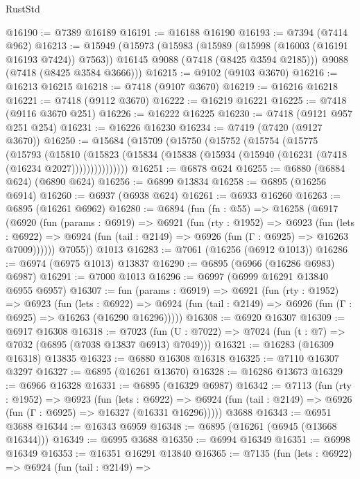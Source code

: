 \begin{lexlean}{RustStd}
\begin{coremodule}
@16190 := @7389 @16189
@16191 := @16188 @16190
@16193 := @7394 (@7414 @962)
@16213 := @15949
    (@15973
      (@15983
        (@15989 (@15998 (@16003 (@16191 @16193 @7424)) @7563))
        @16145
        @9088
        (@7418 (@8425 @3594 @2185)))
      @9088
      (@7418 (@8425 @3584 @3666)))
@16215 := @9102 (@9103 @3670)
@16216 := @16213 @16215
@16218 := @7418 (@9107 @3670)
@16219 := @16216 @16218
@16221 := @7418 (@9112 @3670)
@16222 := @16219 @16221
@16225 := @7418 (@9116 @3670 @251)
@16226 := @16222 @16225
@16230 := @7418 (@9121 @957 @251 @254)
@16231 := @16226 @16230
@16234 := @7419 (@7420 (@9127 @3670))
@16250 := @15684
    (@15709
      (@15750
        (@15752
          (@15754
            (@15775
              (@15793
                (@15810
                  (@15823
                    (@15834 (@15838 (@15934 (@15940 (@16231 (@7418 (@16234 @2027)))))))))))))))
@16251 := @6878 @624
@16255 := @6880 (@6884 @624) (@6890 @624)
@16256 := @6899 @13834
@16258 := @6895 (@16256 @6914)
@16260 := @6937 (@6938 @624)
@16261 := @6933 @16260
@16263 := @6895 (@16261 @6962)
@16280 := @6894
    (fun (fn : @55) =>
    @16258
      (@6917
        (@6920
          (fun (params : @6919) =>
          @6921
            (fun (rty : @1952) =>
            @6923
              (fun (lets : @6922) =>
              @6924 (fun (tail : @2149) => @6926 (fun (Γ : @6925) => @16263 @7009))))))
        @7055))
    @1013
@16283 := @7061 (@16256 (@6912 @1013))
@16286 := @6974 (@6975 @1013) @13837
@16290 := @6895 (@6966 (@16286 @6983) @6987)
@16291 := @7000 @1013
@16296 := @6997 (@6999 @16291 @13840 @6955 @6957)
@16307 := fun (params : @6919) =>
  @6921
    (fun (rty : @1952) =>
    @6923
      (fun (lets : @6922) =>
      @6924 (fun (tail : @2149) => @6926 (fun (Γ : @6925) => @16263 (@16290 @16296)))))
@16308 := @6920 @16307
@16309 := @6917 @16308
@16318 := @7023
    (fun (U : @7022) => @7024 (fun (t : @7) => @7032 (@6895 (@7038 @13837 @6913) @7049)))
@16321 := @16283 (@16309 @16318) @13835
@16323 := @6880 @16308 @16318
@16325 := @7110 @16307 @3297
@16327 := @6895 (@16261 @13670)
@16328 := @16286 @13673
@16329 := @6966 @16328
@16331 := @6895 (@16329 @6987)
@16342 := @7113
    (fun (rty : @1952) =>
    @6923
      (fun (lets : @6922) =>
      @6924 (fun (tail : @2149) => @6926 (fun (Γ : @6925) => @16327 (@16331 @16296)))))
    @3688
@16343 := @6951 @3688
@16344 := @16343 @6959
@16348 := @6895 (@16261 (@6945 (@13668 @16344)))
@16349 := @6995 @3688
@16350 := @6994 @16349
@16351 := @6998 @16349
@16353 := @16351 @16291 @13840
@16365 := @7135
    (fun (lets : @6922) =>
    @6924
      (fun (tail : @2149) =>

\end{coremodule}
\end{lexlean}
